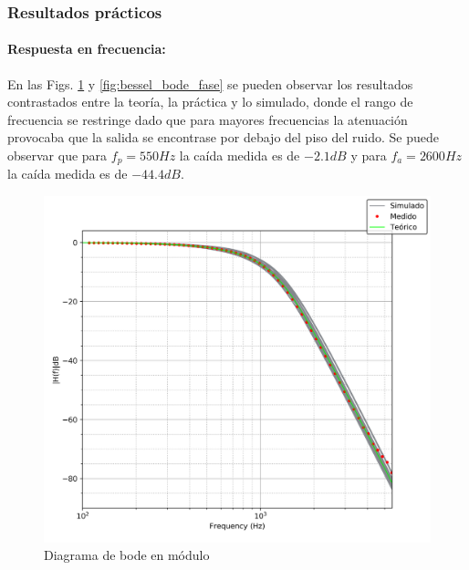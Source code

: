 \subsubsection{Resultados pr\'acticos}

\paragraph{Respuesta en frecuencia:} En las Figs. \ref{fig:bessel_bode_modulo} y \ref{fig:bessel_bode_fase} se pueden observar los resultados
contrastados entre la teor\'ia, la pr\'actica y lo simulado, donde el rango de frecuencia se restringe dado que para mayores frecuencias la atenuaci\'on
provocaba que la salida se encontrase por debajo del piso del ruido. Se puede observar que para $f_p = 550Hz$ la ca\'ida medida es de $-2.1dB$ y para $f_a = 2600Hz$ la ca\'ida
medida es de $-44.4dB$.

\begin{figure}[H]
	\centering
	\includegraphics[scale=0.7]{../EJ1/Recursos/bessel_bode_modula.png}
	\caption{Diagrama de bode en m\'odulo}
	\label{fig:bessel_bode_modulo}
\end{figure}

